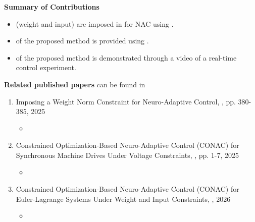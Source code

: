 \begin{frame}{\insertsubsectionhead}

    \textbf{Summary of Contributions}

  \begin{itemize}
    \item {} (weight and input) are imposed in  for NAC using .
    \item {} of the proposed method is provided using .
    \item {} of the proposed method is demonstrated through a video of a real-time control experiment.
  \end{itemize}

  \hfill

  \textbf{Related published papers} can be found in 
  \begin{enumerate}
    \item
        Imposing a Weight Norm Constraint for Neuro-Adaptive Control, , pp. 380-385, 2025
    \begin{itemize}
        \item {}
    \end{itemize}
    \item
        Constrained Optimization-Based Neuro-Adaptive Control (CONAC) for Synchronous Machine Drives Under Voltage Constraints, , pp. 1-7, 2025
    \begin{itemize}
        \item {}
    \end{itemize}
    \item
        Constrained Optimization-Based Neuro-Adaptive Control (CONAC) for Euler-Lagrange Systems Under Weight and Input Constraints, , 2026
    \begin{itemize}
        \item {}
    \end{itemize}
  \end{enumerate}

\end{frame}